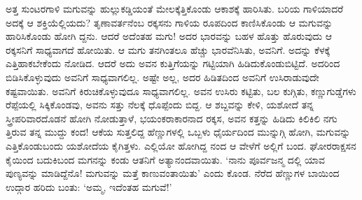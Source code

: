 ಅತ್ತ ಸುಂಟರಗಾಳಿ ಮಗುವನ್ನು ಹುಲ್ಲುಕಡ್ಡಿಯಂತೆ ಮೇಲಕ್ಕೆತ್ತಿಕೊಂಡು ಆಕಾಶಕ್ಕೆ ಹಾರಿಸಿತು. ಬರಿಯ ಗಾಳಿಯಾದರೆ ಅದಕ್ಕೆ ಆ ಶಕ್ತಿಯೆಲ್ಲಿಯದು? ತೃಣಾವರ್ತನೆಂಬ ರಕ್ಕಸನು ಗಾಳಿಯ ರೂಪದಿಂದ ಕಾಣಿಸಿಕೊಂಡು ಆ ಮಗುವನ್ನು ಹಾರಿಸಿಕೊಂಡು ಹೋಗಿ ದ್ದನು. ಆದರೆ ಅದೆಂತಹ ಮಗು! ಅದರ ಭಾರವನ್ನು ಬಹಳ ಹೊತ್ತು ಹೊರುವುದು ಆ ರಕ್ಕಸನಿಗೆ ಸಾಧ್ಯವಾಗದೆ ಹೋಯಿತು. ಆ ಮಗು ತನಗಿಂತಲೂ ಹೆಚ್ಚು ಭಾರವೆನಿಸಿತು, ಅವನಿಗೆ. ಅದನ್ನು ಕೆಳಕ್ಕೆ ಎತ್ತಿಹಾಕಬೇಕೆಂದು ನೋಡಿದ. ಆದರೆ ಅದು ಅವನ ಕುತ್ತಿಗೆಯನ್ನು ಗಟ್ಟಿಯಾಗಿ ಹಿಡಿದುಕೊಂಡುಬಿಟ್ಟಿದೆ. ಅದರಿಂದ ಬಿಡಿಸಿಕೊಳ್ಳುವುದು ಅವನಿಗೆ ಸಾಧ್ಯವಾಗಲಿಲ್ಲ. ಅಷ್ಟೇ ಅಲ್ಲ, ಅದರ ಹಿಡಿತದಿಂದ ಅವನಿಗೆ ಉಸಿರಾಡುವುದೇ ಕಷ್ಟವಾಯಿತು. ಅವನಿಗೆ ಕಿರುಚಿಕೊಳ್ಳುವುದೂ ಸಾಧ್ಯವಾಗಲಿಲ್ಲ. ಅವನ ಉಸಿರು ಕಟ್ಟಿತು, ಬಲ ಕುಗ್ಗಿತು, ಕಣ್ಣುಗುಡ್ಡೆಗಳು ರೆಪ್ಪೆಯಲ್ಲಿ ಸಿಕ್ಕಿಕೊಂಡವು, ಅವನು ಸತ್ತು ನೆಲಕ್ಕೆ ಧೊಪ್ಪೆಂದು ಬಿದ್ದ. ಆ ಶಬ್ದವನ್ನು ಕೇಳಿ, ಯಶೋದೆ ತನ್ನ ಸ್ತ್ರೀಪರಿವಾರದೊಡನೆ ಹೋಗಿ ನೋಡುತ್ತಾಳೆ, ಭಯಂಕರಾಕಾರನಾದ ರಕ್ಕಸ, ಅವನ ಕತ್ತನ್ನು ಹಿಡಿದು ಕಿಲಿಕಿಲಿ ನಗು ತ್ತಿರುವ ತನ್ನ ಮುದ್ದು ಕಂದ! ಆಕೆಯ ಸುತ್ತಲಿದ್ದ ಹೆಣ್ಣುಗಳಲ್ಲಿ ಒಬ್ಬಳು ಧೈರ್ಯದಿಂದ ಮುನ್ನುಗ್ಗಿ ಹೋಗಿ, ಮಗುವನ್ನು ಎತ್ತಿಕೊಂಡುಬಂದು ಯಶೋದೆಯ ಕೈಗಿತ್ತಳು. ಎಲ್ಲಿಯೋ ಹೋಗಿದ್ದ ನಂದ ಆ ವೇಳೆಗೆ ಅಲ್ಲಿಗೆ ಬಂದ. ಘೋರರಾಕ್ಷಸನ ಕೈಯಿಂದ ಬದುಕಿಬಂದ ಮಗನನ್ನು ಕಂಡು ಆತನಿಗೆ ಅತ್ಯಾನಂದವಾಯಿತು. ‘ನಾನು ಪೂರ್ವಜನ್ಮ ದಲ್ಲಿ ಯಾವ ಪುಣ್ಯವನ್ನು ಮಾಡಿದ್ದೆನೊ! ಮಗುವನ್ನು ಮತ್ತೆ ಕಾಣುವಂತಾಯಿತು’ ಎಂದು ಕೊಂಡ. ನೆರೆದ ಹೆಣ್ಣುಗಳ ಬಾಯಿಂದ ಉದ್ಗಾರ ಹರಿದು ಬಂತು: ‘ಅಮ್ಮ, ಇದೆಂತಹ ಮಗುವೆ!’


